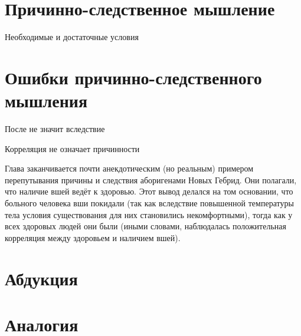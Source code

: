 \documentclass[aspectratio=169]{beamer}
\begin{document}
\section{Причинно-следственное мышление}

\begin{frame}
Необходимые и достаточные условия
\end{frame}

\section{Ошибки причинно-следственного мышления}

\begin{frame}
После не значит вследствие
\end{frame}

\begin{frame}
Корреляция не означает причинности
\end{frame}

Глава заканчивается почти анекдотическим (но реальным) примером перепутывания причины и следствия аборигенами Новых Гебрид. Они полагали, что наличие вшей ведёт к здоровью. Этот вывод делался на том основании, что больного человека вши покидали (так как вследствие повышенной температуры тела условия существования для них становились некомфортными), тогда как у всех здоровых людей они были (иными словами, наблюдалась положительная корреляция между здоровьем и наличием вшей).

\section{Абдукция}

\section{Аналогия}
\end{document}
